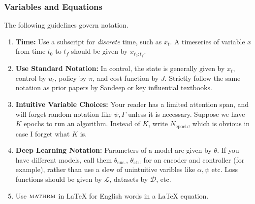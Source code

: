 \subsubsection{Variables and Equations}

The following guidelines govern notation.

\begin{enumerate}
    \item \textbf{Time: } Use a subscript for \textit{discrete} time, such as $x_t$. A timeseries of variable $x$ from time $t_0$ to $t_f$ should be given by $x_{t_0:t_f}$.
    \item \textbf{Use Standard Notation: } In control, the state is generally given by $x_t$, control by $u_t$, policy by $\pi$, and cost function by $J$. Strictly follow the same notation as prior papers by Sandeep or key influential textbooks.
    \item \textbf{Intuitive Variable Choices: } Your reader has a limited attention span, and will forget random notation like $\psi, \Gamma$ unless it is necessary. Suppose we have $K$ epochs to run an algorithm. Instead of $K$, write $N_{\mathrm{epoch}}$, which is obvious in case I forget what $K$ is.
    \item \textbf{Deep Learning Notation: } Parameters of a model are given by $\theta$. If you have different models, call them $\theta_{\mathrm{enc.}}$, $\theta_{\mathrm{ctrl}}$ for an encoder and controller (for example), rather than use a slew of unintuitive varibles like $\alpha, \psi$ etc. Loss functions should be given by $\mathcal{L}$, datasets by $\mathcal{D}$, etc.
    \item Use $\textsc{mathrm}$ in LaTeX for English words in a LaTeX equation.
\end{enumerate}



